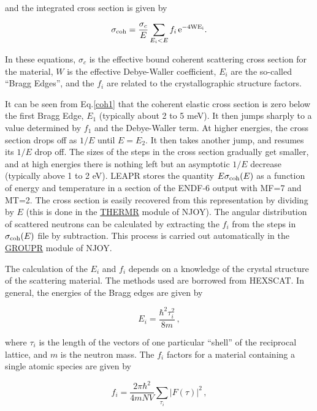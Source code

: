 \noindent
and the integrated cross section is given by

\begin{equation}
   \sigma_{\rm coh}=\frac{\sigma_c}{E}
      \sum_{E_i<E}f_i\,\rm e^{-4WE_i}.
   \label{coh1}
\end{equation}

\noindent
In these equations, $\sigma_c$ is the effective bound coherent scattering
cross section for the material, $W$ is the effective Debye-Waller coefficient,
$E_i$ are the so-called ``Bragg Edges'', and the
$f_i$ are related to the crystallographic structure factors.

It can be seen from Eq.\ref{coh1} that the coherent elastic cross section
is zero below the first Bragg Edge, $E_1$ (typically about 2 to 5 meV).  It
then jumps sharply to a value determined by $f_1$ and the Debye-Waller term.
At higher energies, the cross section drops off as $1/E$ until $E{=}E_2$.
It then takes another jump, and resumes its $1/E$ drop off.  The sizes
of the steps in the cross section gradually get smaller, and at high energies
there is nothing left but an asymptotic $1/E$ decrease (typically above
1 to 2 eV).  LEAPR stores the quantity $E\sigma_{\rm coh}(E)$ as a function
of energy and temperature in a section of the ENDF-6 output with MF=7 and
MT=2.  The cross section is easily recovered from this representation by
dividing by $E$ (this is done in the
\hyperlink{sTHERMRhy}{THERMR} module of NJOY).
The angular distribution of scattered neutrons can be calculated by
extracting the $f_i$ from the steps in $\sigma_{\rm coh}(E)$ file by
subtraction.  This process is carried out automatically in the
\hyperlink{sGROUPRhy}{GROUPR} module of NJOY.

The calculation of the $E_i$ and $f_i$ depends on a knowledge of the
crystal structure of the scattering material.  The methods used are
borrowed from HEXSCAT\cite{HEXSCAT}.
In general, the energies of the Bragg edges are given by

\begin{equation}
   E_i=\frac{\hbar^2\tau_i^2}{8m}\,,
\end{equation}

\noindent
where $\tau_i$ is the length of the vectors of one particular ``shell''
of the reciprocal lattice, and $m$ is the neutron mass.  The $f_i$ factors
for a material containing a single atomic species are given by

\begin{equation}
   f_i=\frac{2\pi\hbar^2}{4mNV}\sum_{\tau_i} |F(\tau)|^2\,,
\end{equation}

